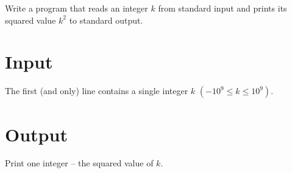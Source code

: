 \documentclass{spiral}
\begin{document}
  \makeheader

  \noindent
  Write a program that reads an integer $k$ from standard input and prints its squared
  value $k^2$ to standard output.

  \section{Input}

    The first (and only) line contains a single integer $k$ $(-10^9 \leq k \leq 10^9)$.

  \section{Output}

    Print one integer – the squared value of $k$.
\end{document}
